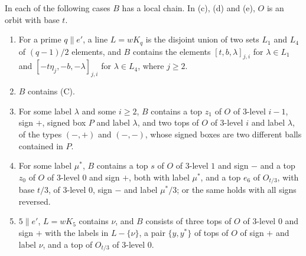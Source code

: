 \begin{lemma}\label{lem:twochains}
In each of the following cases $B$ has a local chain. In \textup{(c)},
\textup{(d)} and \textup{(e)}, $O$ is an orbit with base $t$.
\begin{enumerate}[label=\textup{(\alph*)}]
\item For a prime $q\parallel e'$, a line $L=wK_{q}$ is the disjoint union of
two sets $L_{1}$ and $L_{4}$ of $(q-1)/2$ elements, and $B$ contains the
elements $[t,b,\lambda]_{j,i}$ for $\lambda\in L_{1}$ and
$[-t\eta_{j},-b,-\lambda]_{j,i}$ for $\lambda\in L_{4}$, where $j\ge2$.
\item $B$ contains \textup{(C)}.
\item For some label $\lambda$ and some $i\ge2$, $B$ contains a top $z_{1}$
of $O$ of $3$-level $i-1$, sign $+$, signed box $P$ and label $\lambda$, and
two tops of $O$ of $3$-level $i$ and label $\lambda$, of the types $(-,+)$
and $(-,-)$, whose signed boxes are two different balls contained in $P$.
\item For some label $\mu^{*}$, $B$ contains a top $s$ of $O$ of $3$-level
$1$ and sign $-$ and a top $z_{0}$ of $O$ of $3$-level $0$ and sign $+$, both
with label $\mu^{*}$, and a top $e_{6}$ of $O_{t/3}$, with base $t/3$, of
$3$-level $0$, sign $-$ and label $\mu^{*}/3$; or the same holds with all
signs reversed.
\item $5\parallel e'$, $L=wK_{5}$ contains $\nu$, and $B$ consists of three
tops of $O$ of $3$-level $0$ and sign $+$ with the labels in $L-\{\nu\}$, a
pair $\{y,y^{*}\}$ of tops of $O$ of sign $+$ and label $\nu$, and a top of
$O_{t/3}$ of $3$-level $0$.
\end{enumerate}
\end{lemma}

